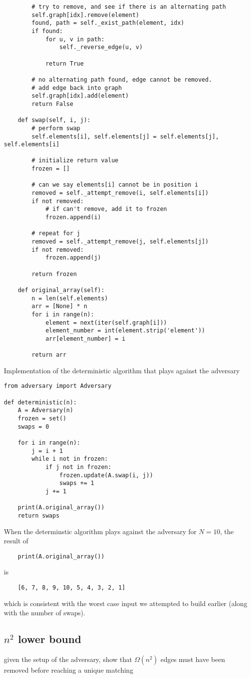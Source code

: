 \documentclass{article}
\begin{document}
\begin{verbatim}
        # try to remove, and see if there is an alternating path
        self.graph[idx].remove(element)
        found, path = self._exist_path(element, idx)
        if found:
            for u, v in path:
                self._reverse_edge(u, v)

            return True

        # no alternating path found, edge cannot be removed.
        # add edge back into graph
        self.graph[idx].add(element)
        return False

    def swap(self, i, j):
        # perform swap
        self.elements[i], self.elements[j] = self.elements[j], self.elements[i]

        # initialize return value
        frozen = []

        # can we say elements[i] cannot be in position i
        removed = self._attempt_remove(i, self.elements[i])
        if not removed:
            # if can't remove, add it to frozen
            frozen.append(i)

        # repeat for j
        removed = self._attempt_remove(j, self.elements[j])
        if not removed:
            frozen.append(j)

        return frozen

    def original_array(self):
        n = len(self.elements)
        arr = [None] * n
        for i in range(n):
            element = next(iter(self.graph[i]))
            element_number = int(element.strip('element'))
            arr[element_number] = i

        return arr
\end{verbatim}

Implementation of the deterministic algorithm that plays against the adversary
\begin{verbatim}
from adversary import Adversary

def deterministic(n):
    A = Adversary(n)
    frozen = set()
    swaps = 0

    for i in range(n):
        j = i + 1
        while i not in frozen:
            if j not in frozen:
                frozen.update(A.swap(i, j))
                swaps += 1
            j += 1

    print(A.original_array())
    return swaps
\end{verbatim}

When the determinstic algorithm plays against the adversary for $N = 10$, the result of 
\begin{verbatim}
    print(A.original_array())
\end{verbatim}
is
\begin{verbatim}
    [6, 7, 8, 9, 10, 5, 4, 3, 2, 1]
\end{verbatim}
which is consistent with the worst case input we attempted to build earlier (along with the number of swaps).

\subsection{$n^2$ lower bound}
given the setup of the adversary, show that $\Omega(n^2)$ edges must have been removed 
before reaching a unique matching
\end{document}
